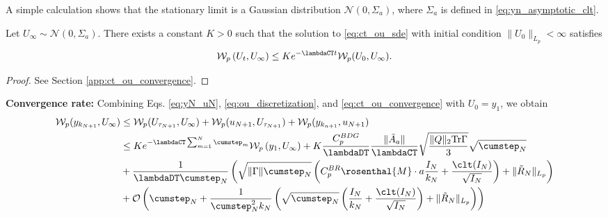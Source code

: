 \documentclass[11pt]{article}
\begin{document}
A simple calculation shows that the stationary limit is a Gaussian distribution $\mathcal{N}(0, \Sigma_a)$, where $\Sigma_a$ is defined in \eqref{eq:yn_asymptotic_clt}.
\begin{lemma}\label{lem:ct_ou_convergence}
    Let $U_\infty \sim \mathcal{N}(0, \Sigma_a)$. 
    There exists a constant $K > 0$ such that the solution to \eqref{eq:ct_ou_sde} with initial condition $\lVert U_0 \rVert_{L_p} <\infty $ satisfies
    \begin{equation}\label{eq:ct_ou_convergence}
        \mathcal{W}_p \left(U_t, U_\infty  \right)
        \leq 
        K e^{-\lambdaCT t} \mathcal{W}_p (U_0, U_\infty) . 
    \end{equation}
\end{lemma}
\begin{proof}
    See Section \ref{app:ct_ou_convergence}. 
\end{proof}
\textbf{Convergence rate:}
Combining Eqs. \eqref{eq:yN_uN}, \eqref{eq:ou_discretization}, and \eqref{eq:ct_ou_convergence} with $U_0 = y_1$, we obtain
\begin{equation}
\begin{split}
    \mathcal{W}_{p} (y_{k_{N+1}}, U_\infty)
    &\leq 
    \mathcal{W}_{p} (U_{\tau_{N+1}}, U_\infty) + \mathcal{W}_{p} (u_{N+1}, U_{\tau_{N+1}})  + \mathcal{W}_{p} (y_{k_{n+1}}, u_{N+1}) 
    \\
    &\leq
    K e^{-\lambdaCT \sum_{m=1}^N \cumstep_m} \mathcal{W}_p \left(y_1, U_\infty \right) 
    +  K\frac{C_p^{BDG}}{\lambdaDT} 
    \frac{\lVert \bar{A}_a \rVert }{\lambdaCT} \sqrt{\frac{\lVert Q \rVert_2\mathrm{Tr} \Gamma}{3}} \sqrt{\cumstep_N}
    \\ &
    + \frac{1}{\lambdaDT \cumstep_N} \left(
    \sqrt{\lVert \Gamma \rVert \cumstep_N} \left(C_{p}^{BR} \rosenthal{M} \cdot a \frac{I_N}{k_N} + \frac{\clt(I_N)}{\sqrt{I_N}} \right)
    + \lVert \tilde{R}_N \rVert_{L_p}
    \right)    
    \\ &
    + \mathcal{O}\left(\cumstep_N 
    +
    \frac{1}{\cumstep_N^2 k_N} \left( \sqrt{\cumstep_N} \left(\frac{I_N}{k_N} + \frac{ \clt (I_N)}{\sqrt{I_N}} \right) + \lVert \tilde{R}_N \rVert_{L_p} \right) 
    \right)
\end{split}
\end{equation}
\end{document}
